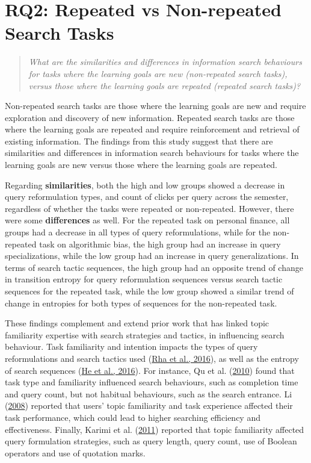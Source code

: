 \documentclass[letterpaper, nobind]{templates/ociamthesis}
\begin{document}
\hypertarget{rq2-repeated-vs-non-repeated-search-tasks}{%
\section{RQ2: Repeated vs Non-repeated Search Tasks}\label{rq2-repeated-vs-non-repeated-search-tasks}}

\begin{quote}
\emph{What are the similarities and differences in information search behaviours for tasks where the learning goals are new (non-repeated search tasks), versus those where the learning goals are repeated (repeated search tasks)?}
\end{quote}

Non-repeated search tasks are those where the learning goals are new and require exploration and discovery of new information.
Repeated search tasks are those where the learning goals are repeated and require reinforcement and retrieval of existing information.
The findings from this study suggest that there are similarities and differences in information search behaviours for tasks where the learning goals are new versus those where the learning goals are repeated.

Regarding \textbf{similarities}, both the high and low groups showed a decrease in query reformulation types, and count of clicks per query across the semester, regardless of whether the tasks were repeated or non-repeated.
However, there were some \textbf{differences} as well.
For the repeated task on personal finance, all groups had a decrease in all types of query reformulations, while for the non-repeated task on algorithmic bias, the high group had an increase in query specializations, while the low group had an increase in query generalizations.
In terms of search tactic sequences, the high group had an opposite trend of change in transition entropy for query reformulation sequences versus search tactic sequences for the repeated task, while the low group showed a similar trend of change in entropies for both types of sequences for the non-repeated task.

These findings complement and extend prior work that has linked topic familiarity expertise with search strategies and tactics, in influencing search behaviour.
Task familiarity and intention impacts the types of query reformulations and search tactics used (\protect\hyperlink{ref-rha2016exploring}{Rha et al., 2016}), as well as the entropy of search sequences (\protect\hyperlink{ref-he2016beyond}{He et al., 2016}).
For instance, Qu et al. (\protect\hyperlink{ref-qu2010effect}{2010}) found that task type and familiarity influenced search behaviours, such as completion time and query count, but not habitual behaviours, such as the search entrance.
Li (\protect\hyperlink{ref-li2008relationships}{2008}) reported that users' topic familiarity and task experience affected their task performance, which could lead to higher searching efficiency and effectiveness.
Finally, Karimi et al. (\protect\hyperlink{ref-karimi2011domain}{2011}) reported that topic familiarity affected query formulation strategies, such as query length, query count, use of Boolean operators and use of quotation marks.
\end{document}
